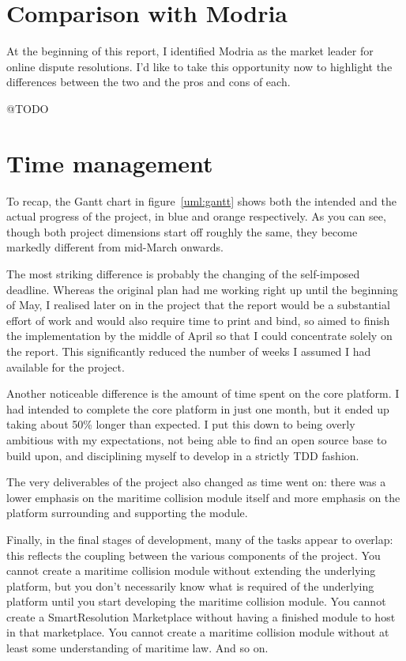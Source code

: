 \section{Comparison with Modria}

At the beginning of this report, I identified Modria as the market leader for online dispute resolutions. I'd like to take this opportunity now to highlight the differences between the two and the pros and cons of each.

@TODO

\section{Time management}

To recap, the Gantt chart in figure~\ref{uml:gantt} shows both the intended and the actual progress of the project, in blue and orange respectively. As you can see, though both project dimensions start off roughly the same, they become markedly different from mid-March onwards.

The most striking difference is probably the changing of the self-imposed deadline. Whereas the original plan had me working right up until the beginning of May, I realised later on in the project that the report would be a substantial effort of work and would also require time to print and bind, so aimed to finish the implementation by the middle of April so that I could concentrate solely on the report. This significantly reduced the number of weeks I assumed I had available for the project.

Another noticeable difference is the amount of time spent on the core platform. I had intended to complete the core platform in just one month, but it ended up taking about 50\% longer than expected. I put this down to being overly ambitious with my expectations, not being able to find an open source base to build upon, and disciplining myself to develop in a strictly TDD fashion.

The very deliverables of the project also changed as time went on: there was a lower emphasis on the maritime collision module itself and more emphasis on the platform surrounding and supporting the module.

Finally, in the final stages of development, many of the tasks appear to overlap: this reflects the coupling between the various components of the project. You cannot create a maritime collision module without extending the underlying platform, but you don't necessarily know what is required of the underlying platform until you start developing the maritime collision module. You cannot create a SmartResolution Marketplace without having a finished module to host in that marketplace. You cannot create a maritime collision module without at least some understanding of maritime law. And so on.

